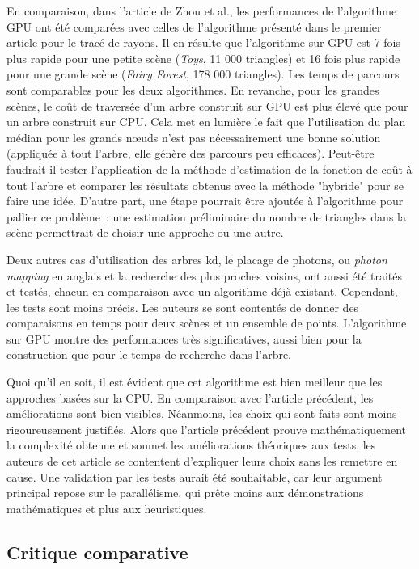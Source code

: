 \documentclass[a4paper]{article}
\begin{document}
En comparaison, dans l'article de Zhou et al., les performances de l'algorithme GPU ont été comparées avec celles de l'algorithme présenté dans le premier article pour le tracé de rayons. Il en résulte que l'algorithme sur GPU est 7 fois plus rapide pour une petite scène (\textit{Toys}, 11 000 triangles) et 16 fois plus rapide pour une grande scène (\textit{Fairy Forest}, 178 000 triangles). Les temps de parcours sont comparables pour les deux algorithmes. En revanche, pour les grandes scènes, le coût de traversée d'un arbre construit sur GPU est plus élevé que pour un arbre construit sur CPU. Cela met en lumière le fait que l'utilisation du plan médian pour les grands nœuds n'est pas nécessairement une bonne solution (appliquée à tout l'arbre, elle génère des parcours peu efficaces). Peut-être faudrait-il tester l'application de la méthode d'estimation de la fonction de coût à tout l'arbre et comparer les résultats obtenus avec la méthode "hybride" pour se faire une idée. D'autre part, une étape pourrait être ajoutée à l'algorithme pour pallier ce problème~: une estimation préliminaire du nombre de triangles dans la scène permettrait de choisir une approche ou une autre.

Deux autres cas d'utilisation des arbres kd, le placage de photons, ou \textit{photon mapping} en anglais et la recherche des plus proches voisins, ont aussi été traités et testés, chacun en comparaison avec un algorithme déjà existant. Cependant, les tests sont moins précis. Les auteurs se sont contentés de donner des comparaisons en temps pour deux scènes et un ensemble de points. L'algorithme sur GPU montre des performances très significatives, aussi bien pour la construction que pour le temps de recherche dans l'arbre.

Quoi qu'il en soit, il est évident que cet algorithme est bien meilleur que les approches basées sur la CPU. En comparaison avec l'article précédent, les améliorations sont bien visibles. Néanmoins, les choix qui sont faits sont moins rigoureusement justifiés. Alors que l'article précédent prouve mathématiquement la complexité obtenue et soumet les améliorations théoriques aux tests, les auteurs de cet article se contentent d'expliquer leurs choix sans les remettre en cause. Une validation par les tests aurait été souhaitable, car leur argument principal repose sur le parallélisme, qui prête moins aux démonstrations mathématiques et plus aux heuristiques.

\subsection{Critique comparative}
\end{document}
